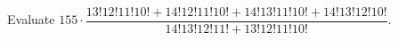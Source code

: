 Evaluate $155\cdot\dfrac{13!12!11!10!+14!12!11!10!+14!13!11!10!+14!13!12!10!}{14!13!12!11!+13!12!11!10!}$.
